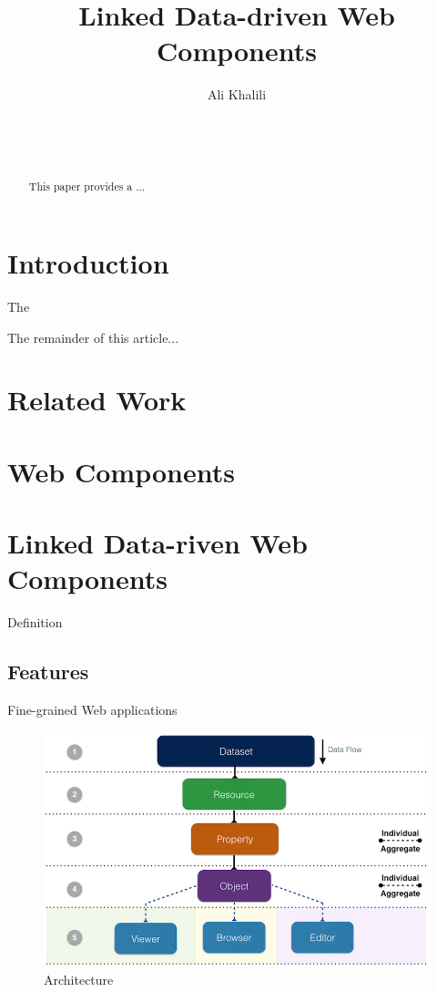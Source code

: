 \documentclass{acm_proc_article-sp}
\begin{document}
\title{Linked Data-driven Web Components}
\subtitle{}

\author{
\alignauthor
Ali Khalili\\
       \\
       \\
       \\
}


\maketitle
\begin{abstract}
This paper provides a ...
\end{abstract}


\section{Introduction}
The


The remainder of this article...

\section{Related Work}

\section{Web Components}

\section{Linked Data-riven Web Components}

Definition

\subsection{Features}

Fine-grained Web applications

\begin{figure}
  \includegraphics[width=.9\linewidth]{images/architecture.jpg}
  \caption{Architecture}
\end{figure}
\end{document}
